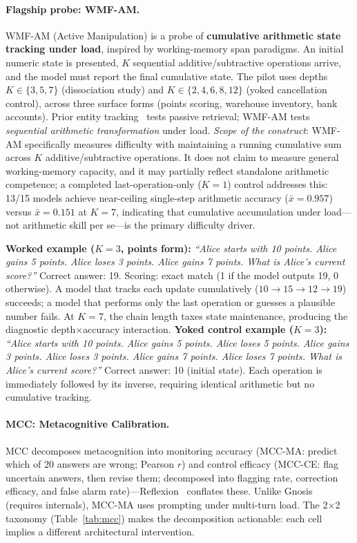 \documentclass{article}
\begin{document}
\paragraph{Flagship probe: WMF-AM.}
WMF-AM (Active Manipulation) is a probe of \textbf{cumulative arithmetic
state tracking under load}, inspired by working-memory span paradigms.
An initial numeric state is presented, $K$ sequential additive/subtractive
operations arrive, and the model must report the final cumulative state.
The pilot uses depths $K \in \{3,5,7\}$ (dissociation study) and $K
\in \{2,4,6,8,12\}$ (yoked cancellation control), across three surface
forms (points scoring, warehouse inventory, bank accounts). Prior entity
tracking~\citep{entitytracking2023} tests passive retrieval; WMF-AM
tests \emph{sequential arithmetic transformation} under load.
\emph{Scope of the construct}: WMF-AM specifically measures difficulty
with maintaining a running cumulative sum across $K$ additive/subtractive
operations. It does not claim to measure general working-memory capacity,
and it may partially reflect standalone arithmetic competence;
a completed last-operation-only ($K{=}1$) control addresses this:
13/15 models achieve near-ceiling single-step arithmetic accuracy
($\bar{x}{=}0.957$) versus $\bar{x}{=}0.151$ at $K{=}7$,
indicating that cumulative accumulation under load—not arithmetic
skill per se—is the primary difficulty driver.

\textbf{Worked example ($K{=}3$, points form):} \emph{``Alice starts
with 10 points. Alice gains 5 points. Alice loses 3 points. Alice gains
7 points. What is Alice's current score?''} Correct answer: 19.
Scoring: exact match (1 if the model outputs 19, 0 otherwise).
A model that tracks each update cumulatively
($10 \to 15 \to 12 \to 19$) succeeds; a model that performs only the
last operation or guesses a plausible number fails. At $K{=}7$, the
chain length taxes state maintenance, producing the diagnostic
depth$\times$accuracy interaction.
\textbf{Yoked control example ($K{=}3$):} \emph{``Alice starts with 10
points. Alice gains 5 points. Alice loses 5 points. Alice gains 3
points. Alice loses 3 points. Alice gains 7 points. Alice loses 7
points. What is Alice's current score?''} Correct answer: 10 (initial
state). Each operation is immediately followed by its inverse, requiring
identical arithmetic but no cumulative tracking.

\paragraph{MCC: Metacognitive Calibration.}
MCC decomposes metacognition into monitoring accuracy (MCC-MA: predict
which of 20 answers are wrong; Pearson $r$) and control efficacy
(MCC-CE: flag uncertain answers, then revise them; decomposed into
flagging rate, correction efficacy, and false alarm
rate)---Reflexion~\citep{shinn2023reflexion} conflates these. Unlike
Gnosis~\citep{ghasemabadi2025can} (requires internals), MCC-MA uses
prompting under multi-turn load. The 2$\times$2 taxonomy
(Table~\ref{tab:mcc}) makes the decomposition actionable: each cell
implies a different architectural intervention.
\end{document}
